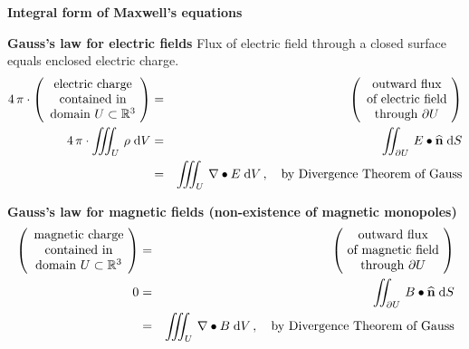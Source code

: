 
\vskip 0.5cm
\noindent
\begin{center}
\textbf{\large Integral form of Maxwell's equations}
\end{center}


\vskip 0.5cm
\noindent
\textbf{Gauss's law for electric fields}
\vskip 0.1cm
\noindent
Flux of electric field through a closed surface equals enclosed electric charge.
\begin{eqnarray*}
	4\,\pi\cdot\left(\begin{array}{c}
	\textnormal{electric charge}
	\\
	\textnormal{contained in}
	\\
	\textnormal{domain $U \subset \Re^{3}$}
	\end{array}\!\right)
&=&
	\left(\begin{array}{c}
	\textnormal{outward flux}
	\\
	\textnormal{of electric field}
	\\
	\textnormal{through $\partial U$}
	\end{array}\!\right)
\\
4\,\pi\cdot\int\!\!\!\!\int\!\!\!\!\int_{U}\, \rho \;\d V
&=&
	\int\!\!\!\!\int_{\partial U}\, E \bullet \widehat{\mathbf{n}} \;\d S
\\
&=&
	\int\!\!\!\!\int\!\!\!\!\int_{U}\, \nabla \bullet E \;\d V\,,
	\quad
	\textnormal{by Divergence Theorem of Gauss}
\end{eqnarray*}


\vskip 0.5cm
\noindent
\textbf{Gauss's law for magnetic fields (non-existence of magnetic monopoles)}
\begin{eqnarray*}
	\left(\begin{array}{c}
	\textnormal{magnetic charge}
	\\
	\textnormal{contained in}
	\\
	\textnormal{domain $U \subset \Re^{3}$}
	\end{array}\!\right)
&=&
	\left(\!\begin{array}{c}
	\textnormal{outward flux}
	\\
	\textnormal{of magnetic field}
	\\
	\textnormal{through $\partial U$}
	\end{array}\!\right)
\\
0
&=&
	\int\!\!\!\!\int_{\partial U}\, B \bullet \widehat{\mathbf{n}} \;\d S
\\
&=&
	\int\!\!\!\!\int\!\!\!\!\int_{U}\, \nabla \bullet B \;\d V\,,
	\quad
	\textnormal{by Divergence Theorem of Gauss}
\end{eqnarray*}

